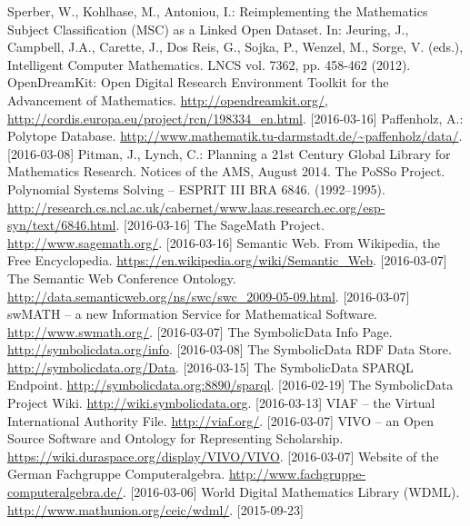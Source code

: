 \documentclass{llncs}
\newcommand{\SD}{{\sc Symbo\-lic\-Data}}
\begin{document}
\begin{thebibliography}{xxx}
  Sperber, W., Kohlhase, M., Antoniou, I.: Reimplementing the Mathematics
  Subject Classification (MSC) as a Linked Open Dataset.  In: Jeuring, J.,
  Campbell, J.A., Carette, J., Dos Reis, G., Sojka, P., Wenzel, M., Sorge,
  V. (eds.), Intelligent Computer Mathematics.  LNCS vol. 7362, pp. 458-462
  (2012).
 OpenDreamKit: Open Digital Research Environment Toolkit for the
  Advancement of Mathematics. \url{http://opendreamkit.org/},
  \url{http://cordis.europa.eu/project/rcn/198334_en.html}. [2016-03-16]
 Paffenholz, A.: Polytope Database.
  \url{http://www.mathematik.tu-darmstadt.de/~paffenholz/data/}.  [2016-03-08] 
 Pitman, J., Lynch, C.: Planning a 21st Century
  Global Library for Mathematics Research.  Notices of the AMS, August
  2014.
 The PoSSo Project. Polynomial Systems Solving -- ESPRIT III BRA
  6846.  (1992--1995).
  \url{http://research.cs.ncl.ac.uk/cabernet/www.laas.research.ec.org/esp-syn/text/6846.html}. 
      [2016-03-16]
 The SageMath Project.  \url{http://www.sagemath.org/}.
  [2016-03-16]
 Semantic Web. From Wikipedia, the Free
  Encyclopedia. \url{https://en.wikipedia.org/wiki/Semantic_Web}. [2016-03-07]
 The Semantic Web Conference Ontology.
  \url{http://data.semanticweb.org/ns/swc/swc_2009-05-09.html}.  [2016-03-07]
 swMATH -- a new Information Service for Mathematical Software.
  \url{http://www.swmath.org/}. [2016-03-07]
 The {\SD} Info Page.  \url{http://symbolicdata.org/info}.
  [2016-03-08]
 The {\SD} RDF Data Store.
  \url{http://symbolicdata.org/Data}.  [2016-03-15]
 The {\SD} SPARQL Endpoint.
  \url{http://symbolicdata.org:8890/sparql}. [2016-02-19]
 The {\SD} Project Wiki.
   \url{http://wiki.symbolicdata.org}. [2016-03-13]
 VIAF -- the Virtual International Authority File.
  \url{http://viaf.org/}. [2016-03-07]
 VIVO -- an Open Source Software and Ontology for Representing
  Scholarship.  \url{https://wiki.duraspace.org/display/VIVO/VIVO}.
  [2016-03-07]
 Website of the German Fachgruppe Computeralgebra.   
  \url{http://www.fachgruppe-computeralgebra.de/}. [2016-03-06]
 World Digital Mathematics Library (WDML).
  \url{http://www.mathunion.org/ceic/wdml/}. [2015-09-23]

\end{thebibliography}
\end{document}
